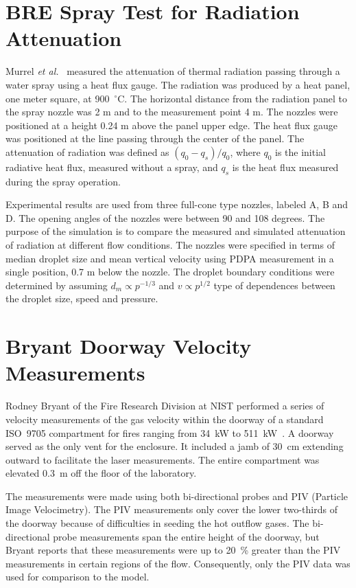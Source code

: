 \section{BRE Spray Test for Radiation Attenuation}

Murrel {\em et al.}~\cite{Murrel:1995} measured the attenuation of thermal radiation passing through a water
spray using a heat flux gauge. The radiation was produced by a heat panel, one meter square, at 900~$^\circ$C. The horizontal distance
from the radiation panel to the spray nozzle was 2 m and to the measurement point 4 m. The nozzles were positioned at
a height 0.24 m above the panel upper edge. The heat flux gauge was positioned at the line passing through the center
of the panel. The attenuation of radiation was defined as $(q_0-q_s)/q_0$, where $q_0$ is the initial radiative heat flux,
measured without a spray, and $q_s$ is the heat flux measured during the spray operation.

Experimental results are used from three full-cone type nozzles, labeled A, B and D. The opening angles of the nozzles were between 90 and 108 degrees.
The purpose of the simulation is to compare the measured and simulated attenuation of radiation at different flow conditions. The nozzles were
specified in terms of median droplet size and mean vertical velocity using PDPA measurement in a single position, 0.7 m below the nozzle. The droplet
boundary conditions were determined by assuming $d_m \propto p^{-1/3}$ and $v \propto p^{1/2}$ type of dependences between the droplet size, speed
and pressure.

\section{Bryant Doorway Velocity Measurements}

Rodney Bryant of the Fire Research Division at NIST performed a series of velocity measurements of the gas
velocity within the doorway of a standard ISO~9705 compartment for fires ranging from
34~kW to 511~kW~\cite{Bryant:FSJ2009,Bryant:EF2009,Bryant:CS2010}. A doorway
served as the only vent for the enclosure. It included a jamb of 30~cm extending outward
to facilitate the laser measurements. The entire compartment was elevated 0.3~m off the floor of the laboratory.

The measurements were made using both bi-directional probes and PIV (Particle Image Velocimetry). The PIV measurements only cover the
lower two-thirds of the doorway because of difficulties in seeding the hot outflow gases. The bi-directional probe measurements span the
entire height of the doorway, but Bryant reports that
these measurements were up to 20~\% greater than the PIV measurements in certain regions of
the flow. Consequently, only the PIV data was used for comparison to the
model.


